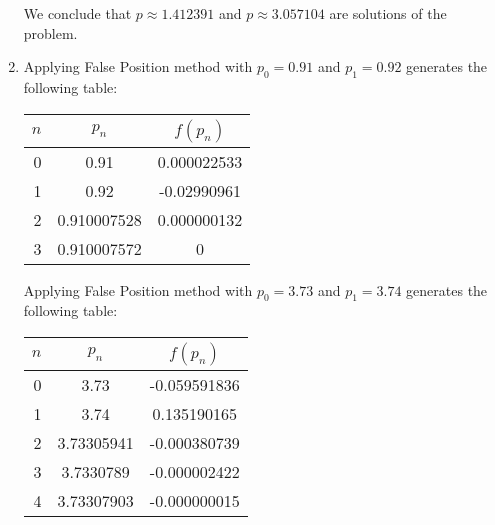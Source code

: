 \documentclass[../../../../Assignments]{subfiles}
\begin{document}
\begin{solution}
\begin{enumerate}[label = \alph*)]
            We conclude that \(p \approx \num{1.412391}\) and \(p \approx
            \num{3.057104}\) are solutions of the problem.

        \item Applying False Position method with \(p_0 = \num{0.91}\) and \(p_1
            = \num{0.92}\) generates the following table:

            \begin{table}[H]
                \centering
                \begin{tabular}{r S[table-format=1.9] S[table-format=-1.9]}
                    \toprule
                    \(n\)  &   {\(p_n\)}   &  {\(f(p_n)\)}  \\
                      &  0.91         &   0.000022533  \\
                        1  &  0.92         &  -0.02990961   \\
                        2  &  0.910007528  &   0.000000132  \\
                        3  &  0.910007572  &   0            \\
                    \bottomrule
                \end{tabular}
            \end{table}

            Applying False Position method with \(p_0 = \num{3.73}\) and \(p_1 =
            \num{3.74}\) generates the following table:

            \begin{table}[H]
                \centering
                \begin{tabular}{r S[table-format=1.8] S[table-format=-1.9]}
                    \toprule
                    \(n\)  &   {\(p_n\)}   &  {\(f(p_n)\)}  \\
                      &  3.73         &  -0.059591836  \\
                        1  &  3.74         &   0.135190165  \\
                        2  &  3.73305941   &  -0.000380739  \\
                        3  &  3.7330789    &  -0.000002422  \\
                        4  &  3.73307903   &  -0.000000015  \\
                    \bottomrule
                \end{tabular}
            \end{table}


\end{enumerate}
\end{solution}
\end{document}
